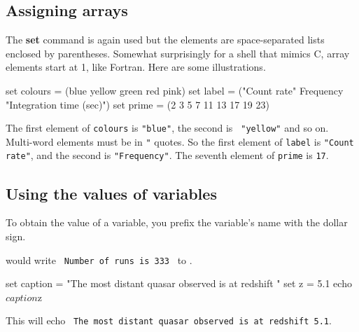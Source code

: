 \documentclass[twoside,11pt,nolof]{starlink}
\begin{document}
\subsection{Assigning arrays
\label{sc4-se:assign_array}}

The \textbf{set} command is again used but the elements are space-separated
lists enclosed by parentheses.  Somewhat surprisingly for a shell that
mimics C, array elements start at 1, like Fortran.
Here are some illustrations.

\begin{small}
\begin{terminalv}
     set colours = (blue yellow green red pink)
     set label = ("Count rate" Frequency "Integration time (sec)")
     set prime = (2 3 5 7 11 13 17 19 23)
\end{terminalv}
\end{small}
The first element of \texttt{colours} is \texttt{"blue"}, the second is {\tt
"yellow"} and so on.  Multi-word elements must be in \texttt{"} quotes.  So
the first element of \texttt{label} is \texttt{"Count rate"}, and the second
is \texttt{"Frequency"}.  The seventh element of \texttt{prime} is \texttt{17}.

\subsection{Using the values of variables
\label{sc4_se_values}}

To obtain the value of a variable, you prefix the variable's name with
the dollar sign.

\begin{small}
\end{small}
would write ~\texttt{Number of runs is 333}~ to .

\begin{small}
\begin{terminalv}
     set caption = "The most distant quasar observed is at redshift "
     set z = 5.1
     echo $caption$z
\end{terminalv}
\end{small}
This will echo ~\texttt{The most distant quasar observed is at redshift 5.1}.
\end{document}
